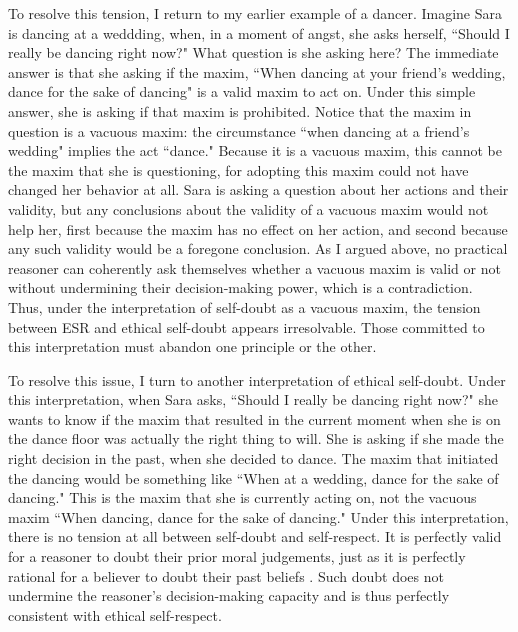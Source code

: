 \begin{isabellebody}
\begin{isamarkuptext}
To resolve this tension, I return to my earlier example of a dancer. Imagine Sara is dancing at a 
weddding, when, in a moment of angst, she asks herself, ``Should I really be dancing right now?" 
What question is she asking here? The immediate answer is that she asking if the maxim, ``When dancing 
at your friend's wedding, dance for the sake of dancing" is a valid maxim to act on. Under this 
simple answer, she is asking if that maxim is prohibited. Notice that the maxim in question is a vacuous
maxim: the circumstance ``when dancing at a friend's wedding" implies the act ``dance." Because it 
is a vacuous maxim, this cannot be the maxim that she is questioning, for adopting this maxim could 
not have changed her behavior at all. Sara is asking a question about her actions and their validity, 
but any conclusions about the validity of a vacuous maxim would not help her, first because the maxim 
has no effect on her action, and second because any such validity would be a foregone conclusion. As 
I argued above, no practical reasoner can coherently ask themselves whether a vacuous maxim is 
valid or not without undermining their decision-making power, which is a contradiction. Thus, under 
the interpretation of self-doubt as a vacuous maxim, the tension between ESR and ethical self-doubt 
appears irresolvable. Those committed to this interpretation must abandon one principle or the other.

To resolve
this issue, I turn to another interpretation of ethical self-doubt. Under this interpretation, when Sara
asks, ``Should I really be dancing right now?" she wants to know if the maxim that 
resulted in the current moment when she is on the dance floor was actually 
the right thing to will. She is asking if she made the right 
decision in the past, when she decided to dance. The maxim that initiated the dancing would be something like ``When at a wedding, dance for the sake 
of dancing." This is the maxim that she is currently acting on, not the vacuous maxim ``When dancing, 
dance for the sake of dancing." Under this interpretation, there is no tension at all between self-doubt 
and self-respect. It is perfectly valid for a reasoner to doubt their prior moral judgements, just as 
it is perfectly rational for a believer to doubt their past beliefs \cite[3-4]{christensen}. Such doubt 
does not undermine the reasoner's decision-making capacity and is thus perfectly consistent with ethical 
self-respect. 


\end{isamarkuptext}
\end{isabellebody}
